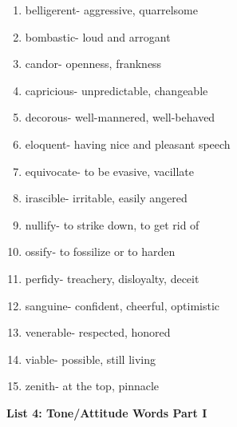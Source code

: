 \begin{enumerate}

\item belligerent- aggressive, quarrelsome 

\item bombastic- loud and arrogant

\item candor- openness, frankness

\item capricious- unpredictable, changeable

\item decorous- well-mannered, well-behaved

\item eloquent- having nice and pleasant speech

\item equivocate- to be evasive, vacillate

\item irascible- irritable, easily angered

\item nullify- to strike down, to get rid of

\item ossify- to fossilize or to harden

\item perfidy- treachery, disloyalty, deceit

\item sanguine- confident, cheerful, optimistic

\item venerable- respected, honored

\item viable- possible, still living

\item zenith- at the top, pinnacle

\end{enumerate}


\textbf{List 4: Tone/Attitude Words Part I}

